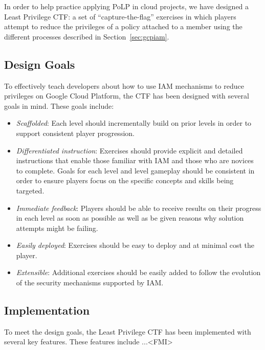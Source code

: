 In order to help practice applying PoLP in cloud projects, we have designed a Least Privilege CTF: a set of ``capture-the-flag'' exercises in which
players attempt to reduce the privileges of a policy attached to a member using the different processes described in Section~\ref{sec:gcpiam}.

\subsection{Design Goals}
To effectively teach developers about how to use IAM mechanisms to reduce privileges on Google Cloud Platform, the CTF has been designed
with several goals in mind.  These goals include:
\begin{itemize}
\item {\em Scaffolded}: Each level should incrementally build on prior levels in order to support consistent player progression.
\item {\em Differentiated instruction}: Exercises should provide explicit and detailed instructions that enable those familiar with IAM and those who are novices to complete.  Goals for each level and level gameplay should be consistent in order to ensure players focus on the specific concepts and skills being targeted.
\item {\em Immediate feedback}: Players should be able to receive results on their progress in each level as soon as possible as well as be given reasons why solution attempts might be failing.
\item {\em Easily deployed}: Exercises should be easy to deploy and at minimal cost the player.
\item {\em Extensible}: Additional exercises should be easily added to follow the evolution of the security mechanisms supported by IAM.
\end{itemize}

\subsection{Implementation}
To meet the design goals, the Least Privilege CTF has been implemented with several key features.  These features include ...<FMI>

